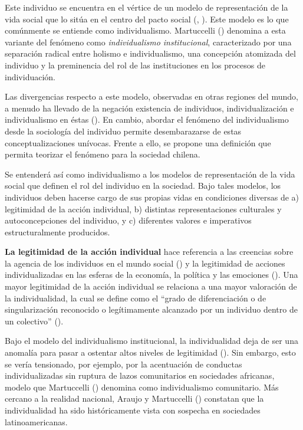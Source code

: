 \documentclass[
  letterpaper,
  DIV=11,
  numbers=noendperiod]{scrartcl}
\begin{document}
Este individuo se encuentra en el vértice de un modelo de representación
de la vida social que lo sitúa en el centro del pacto social
(,
). Este modelo es lo que comúnmente
se entiende como individualismo. Martuccelli
() denomina a esta variante del
fenómeno como \emph{individualismo institucional}, caracterizado por una
separación radical entre holismo e individualismo, una concepción
atomizada del individuo y la preminencia del rol de las instituciones en
los procesos de individuación.

Las divergencias respecto a este modelo, observadas en otras regiones
del mundo, a menudo ha llevado de la negación existencia de individuos,
individualización e individualismo en éstas
(). En cambio, abordar
el fenómeno del individualismo desde la sociología del individuo permite
desembarazarse de estas conceptualizaciones unívocas. Frente a ello, se
propone una definición que permita teorizar el fenómeno para la sociedad
chilena.

Se entenderá así como individualismo a los modelos de representación de
la vida social que definen el rol del individuo en la sociedad. Bajo
tales modelos, los individuos deben hacerse cargo de sus propias vidas
en condiciones diversas de a) legitimidad de la acción individual, b)
distintas representaciones culturales y autoconcepciones del individuo,
y c) diferentes valores e imperativos estructuralmente producidos.

\textbf{La legitimidad de la acción individual} hace referencia a las
creencias sobre la agencia de los individuos en el mundo social
() y la legitimidad de
acciones individualizadas en las esferas de la economía, la política y
las emociones (). Una
mayor legitimidad de la acción individual se relaciona a una mayor
valoración de la individualidad, la cual se define como el ``grado de
diferenciación o de singularización reconocido o legítimamente alcanzado
por un individuo dentro de un colectivo''
().

Bajo el modelo del individualismo institucional, la individualidad deja
de ser una anomalía para pasar a ostentar altos niveles de legitimidad
(). Sin embargo, esto se
vería tensionado, por ejemplo, por la acentuación de conductas
individualizadas sin ruptura de lazos comunitarios en sociedades
africanas, modelo que Martuccelli ()
denomina como individualismo comunitario. Más cercano a la realidad
nacional, Araujo y Martuccelli ()
constatan que la individualidad ha sido históricamente vista con
sospecha en sociedades latinoamericanas.
\end{document}
